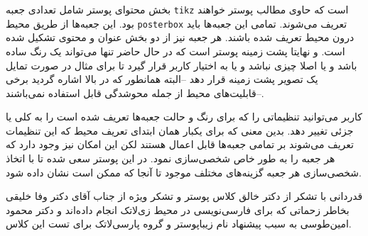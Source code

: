 \documentclass[debug,a0paper]{xebaposter}
\begin{document}
\begin{poster}
\begin{posterbox}[name=imagedataset,column=0,span=1,below=introduction,textborder=roundedleft]
بخش محتوای پوستر شامل تعدادی جعبه \texttt{tikz} است که حاوی مطالب پوستر خواهند بود. این جعبه‌ها از طریق 
محیط \texttt{posterbox} تعریف می‌شوند. تمامی این جعبه‌ها باید درون محیط  تعریف شده باشند. 
هر جعبه نیز از دو بخش عنوان و محتوی تشکیل شده است. و نهایتا پشت زمینه پوستر است که در حال حاضر تنها می‌تواند یک رنگ ساده 
باشد و یا اصلا چیزی نباشد و یا به اختیار کاربر قرار گیرد تا برای مثال در صورت تمایل یک تصویر پشت زمینه قرار دهد --البته همانطور که 
در بالا اشاره گردید برخی قابلیت‌های محیط  از جمله محوشدگی قابل استفاده نمی‌باشند--. 
\end{posterbox}
\begin{posterbox}[name=setting,column=0,span=1,below=imagedataset%
,headerFontColor=brown,textborder=roundedright,headershape=roundedright]
{}
کاربر می‌توانید تنظیماتی را که برای رنگ و حالت جعبه‌ها تعریف شده است را به کلی یا جزئی تغییر دهد. بدین معنی که برای یکبار همان
ابتدای تعریف محیط  که این تنظیمات تعریف می‌شوند بر تمامی جعبه‌ها قابل اعمال هستند لکن این امکان نیز وجود دارد 
که هر جعبه را به طور خاص شخصی‌سازی نمود. در این پوستر سعی شده تا با اتخاذ 
شخصی‌سازی هر جعبه گزینه‌های مختلف موجود تا آنجا که ممکن است نشان داده شود. 
\end{posterbox}
\begin{posterbox}[name=ack,column=0,span=1,below=setting,
,textborder=triangles]{قدردانی}
با تشکر از دکتر  خالق کلاس پوستر و تشکر ویژه از جناب آقای دکتر وفا خلیقی بخاطر زحماتی که برای فارسی‌نویسی در
محیط زی‌لاتک انجام‌ داده‌اند%
و دکتر محمود امین‌طوسی به سبب پیشنهاد نام زیباپوستر و گروه پارسی‌لاتک برای تست این کلاس.

\end{posterbox} 
\end{poster}
\end{document}
